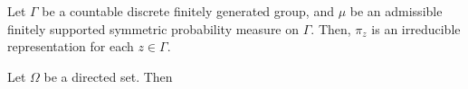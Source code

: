 \documentclass[12pt, class = article, crop = false, a4paper, twoside]{standalone}
\begin{document}

Let $\Gamma$ be a countable discrete finitely generated group, and $\mu$ be an admissible finitely supported symmetric probability measure on $\Gamma$. Then, $\pi_{z}$ is an irreducible representation for each $z\in\Gamma$.

Let $\Omega$ be a directed set. Then 
\end{document}
